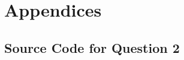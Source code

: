 
\newpage

\section*{Appendices}

\subsection*{Source Code for Question 2}

\lstset{language=r,tabsize=4}

